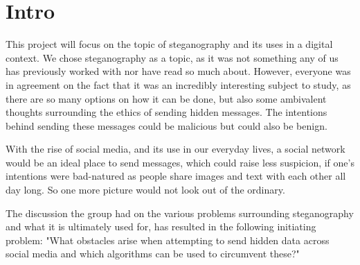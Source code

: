 \section*{Intro}
This project will focus on the topic of steganography and its uses in a digital context.
We chose steganography as a topic, as it was not something any of us has previously worked with nor have read so much about. However, everyone was in agreement on the fact that it was an incredibly interesting subject to study, as there are so many options on how it can be done, but also some ambivalent thoughts surrounding the ethics of sending hidden messages. The intentions behind sending these messages could be malicious but could also be benign.

With the rise of social media, and its use in our everyday lives, a social network would be an ideal place to send messages, which could raise less suspicion, if one's intentions were bad-natured as people share images and text with each other all day long. So one more picture would not look out of the ordinary.

The discussion the group had on the various problems surrounding steganography and what it is ultimately used for, has resulted in the following initiating problem: 
"What obstacles arise when attempting to send hidden data across social media and which algorithms can be used to circumvent these?"